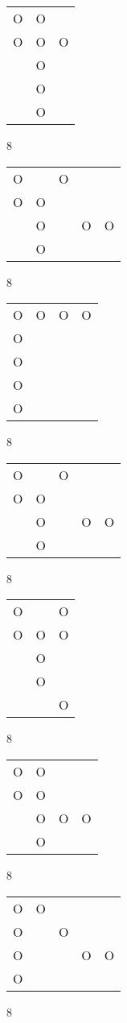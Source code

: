 \begin{tabular}{|m{0.2cm}m{0.2cm}m{0.2cm}|}\hline
O&O& \\
O&O&O\\
 &O& \\
 &O& \\
 &O& \\
\hline\end{tabular}8
\begin{tabular}{|m{0.2cm}m{0.2cm}m{0.2cm}m{0.2cm}m{0.2cm}|}\hline
O& &O& & \\
O&O& & & \\
 &O& &O&O\\
 &O& & & \\
\hline\end{tabular}8
\begin{tabular}{|m{0.2cm}m{0.2cm}m{0.2cm}m{0.2cm}|}\hline
O&O&O&O\\
O& & & \\
O& & & \\
O& & & \\
O& & & \\
\hline\end{tabular}8
\begin{tabular}{|m{0.2cm}m{0.2cm}m{0.2cm}m{0.2cm}m{0.2cm}|}\hline
O& &O& & \\
O&O& & & \\
 &O& &O&O\\
 &O& & & \\
\hline\end{tabular}8
\begin{tabular}{|m{0.2cm}m{0.2cm}m{0.2cm}|}\hline
O& &O\\
O&O&O\\
 &O& \\
 &O& \\
 & &O\\
\hline\end{tabular}8
\begin{tabular}{|m{0.2cm}m{0.2cm}m{0.2cm}m{0.2cm}|}\hline
O&O& & \\
O&O& & \\
 &O&O&O\\
 &O& & \\
\hline\end{tabular}8
\begin{tabular}{|m{0.2cm}m{0.2cm}m{0.2cm}m{0.2cm}m{0.2cm}|}\hline
O&O& & & \\
O& &O& & \\
O& & &O&O\\
O& & & & \\
\hline\end{tabular}8
